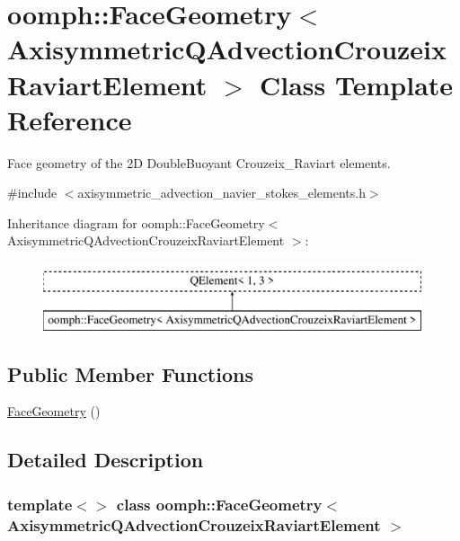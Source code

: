 \hypertarget{classoomph_1_1FaceGeometry_3_01AxisymmetricQAdvectionCrouzeixRaviartElement_01_4}{}\section{oomph\+:\+:Face\+Geometry$<$ Axisymmetric\+Q\+Advection\+Crouzeix\+Raviart\+Element $>$ Class Template Reference}
\label{classoomph_1_1FaceGeometry_3_01AxisymmetricQAdvectionCrouzeixRaviartElement_01_4}


Face geometry of the 2D Double\+Buoyant Crouzeix\+\_\+\+Raviart elements.  




{\ttfamily \#include $<$axisymmetric\+\_\+advection\+\_\+navier\+\_\+stokes\+\_\+elements.\+h$>$}

Inheritance diagram for oomph\+:\+:Face\+Geometry$<$ Axisymmetric\+Q\+Advection\+Crouzeix\+Raviart\+Element $>$\+:\begin{figure}[H]
\begin{center}
\leavevmode
\includegraphics[height=2.000000cm]{classoomph_1_1FaceGeometry_3_01AxisymmetricQAdvectionCrouzeixRaviartElement_01_4}
\end{center}
\end{figure}
\subsection*{Public Member Functions}
\begin{DoxyCompactItemize}
\item 
\hyperlink{classoomph_1_1FaceGeometry_3_01AxisymmetricQAdvectionCrouzeixRaviartElement_01_4_a547500fddb8ee2861be4948339865e99}{Face\+Geometry} ()
\end{DoxyCompactItemize}


\subsection{Detailed Description}
\subsubsection*{template$<$$>$\newline
class oomph\+::\+Face\+Geometry$<$ Axisymmetric\+Q\+Advection\+Crouzeix\+Raviart\+Element $>$}

